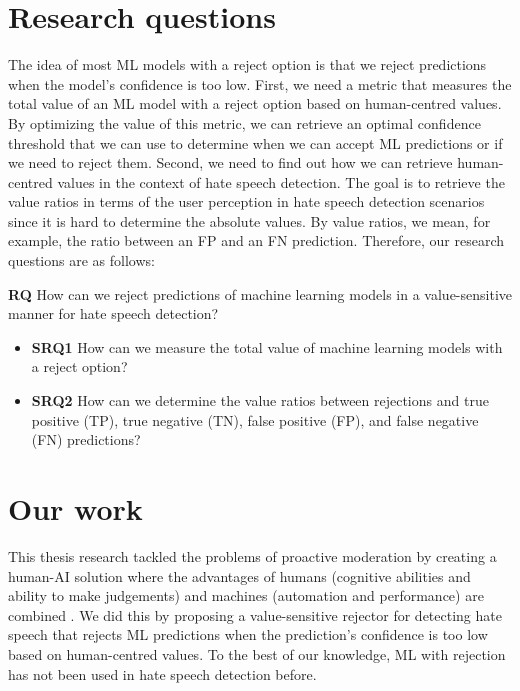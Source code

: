 \section{Research questions}
%
The idea of most ML models with a reject option is that we reject predictions when the model's confidence is too low.
%
First, we need a metric that measures the total value of an ML model with a reject option based on human-centred values.
%
By optimizing the value of this metric, we can retrieve an optimal confidence threshold that we can use to determine when we can accept ML predictions or if we need to reject them.
%
Second, we need to find out how we can retrieve human-centred values in the context of hate speech detection.
%
The goal is to retrieve the value ratios in terms of the user perception in hate speech detection scenarios since it is hard to determine the absolute values.
%
By value ratios, we mean, for example, the ratio between an FP and an FN prediction.
%
Therefore, our research questions are as follows:
%

\begin{flushleft}
	\textbf{RQ} How can we reject predictions of machine learning models in a value-sensitive manner for hate speech detection?
	\begin{itemize}
		\item \textbf{SRQ1} How can we measure the total value of machine learning models with a reject option?
		\item \textbf{SRQ2} How can we determine the value ratios between rejections and true positive (TP), true negative (TN), false positive (FP), and false negative (FN) predictions?
	\end{itemize}
\end{flushleft}

\section{Our work}
This thesis research tackled the problems of proactive moderation by creating a human-AI solution where the advantages of humans (cognitive abilities and ability to make judgements) and machines (automation and performance) are combined \citep{woo2020future}.
%
We did this by proposing a value-sensitive rejector for detecting hate speech that rejects ML predictions when the prediction's confidence is too low based on human-centred values.
%
To the best of our knowledge, ML with rejection has not been used in hate speech detection before.
%


